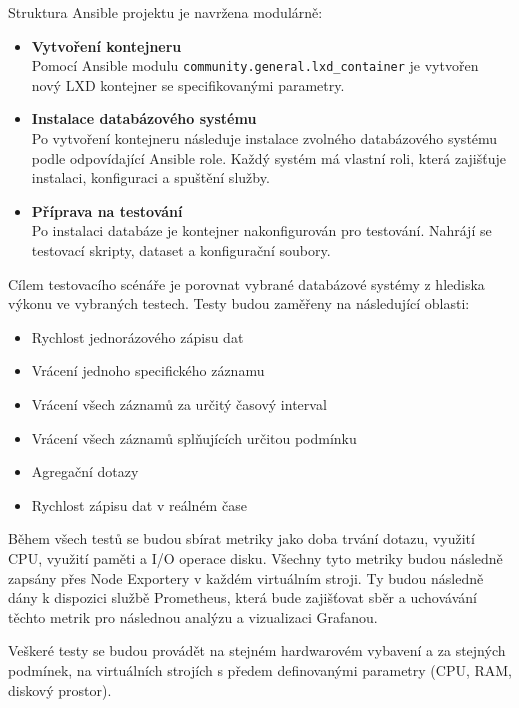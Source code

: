 Struktura Ansible projektu je navržena modulárně:

\begin{itemize}
    \item \textbf{Vytvoření kontejneru} \\
    Pomocí Ansible modulu \texttt{community.general.lxd\_container} je vytvořen nový LXD kontejner se specifikovanými parametry.
    
    \item \textbf{Instalace databázového systému} \\
    Po vytvoření kontejneru následuje instalace zvolného databázového systému podle odpovídající Ansible role. 
    Každý systém má vlastní roli, která zajišťuje instalaci, konfiguraci a spuštění služby.
    
    \item \textbf{Příprava na testování} \\
    Po instalaci databáze je kontejner nakonfigurován pro testování. 
    Nahrájí se testovací skripty, dataset a konfigurační soubory.
\end{itemize} 


Cílem testovacího scénáře je porovnat vybrané databázové systémy z hlediska výkonu ve vybraných testech. Testy budou zaměřeny na následující oblasti:
\begin{itemize}
    \item Rychlost jednorázového zápisu dat 
    \item Vrácení jednoho specifického záznamu
    \item Vrácení všech záznamů za určitý časový interval
    \item Vrácení všech záznamů splňujících určitou podmínku
    \item Agregační dotazy
    \item Rychlost zápisu dat v reálném čase
\end{itemize}

Během všech testů se budou sbírat metriky jako doba trvání dotazu, využití CPU, využití paměti a I/O operace disku.
Všechny tyto metriky budou následně zapsány přes Node Exportery v každém virtuálním stroji.
Ty budou následně dány k dispozici službě Prometheus, která bude zajišťovat sběr a uchovávání těchto metrik pro následnou analýzu a vizualizaci Grafanou.

Veškeré testy se budou provádět na stejném hardwarovém vybavení a za stejných podmínek, na virtuálních strojích s předem definovanými parametry (CPU, RAM, diskový prostor).



